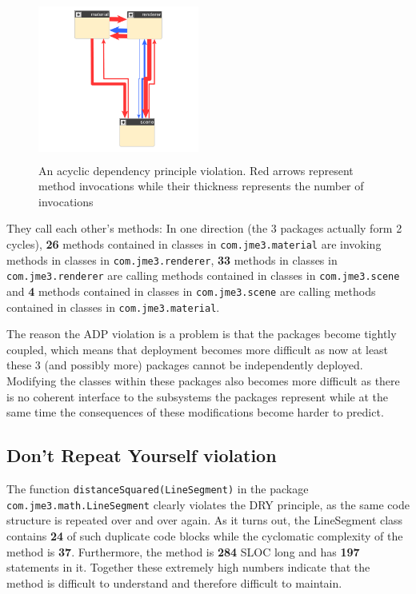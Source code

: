 \documentclass[a4paper, 10pt]{article}
\begin{document}
\begin{figure}
\includegraphics[width=200px, height=200px]{figures/adp-violation.png}
\caption{An acyclic dependency principle violation. Red arrows
  represent method invocations while their thickness represents the
  number of invocations}
\label{fig:adp-violation}
\end{figure}

They call each other's methods: In one direction (the 3 packages
actually form 2 cycles), \textbf{26} methods contained in classes in
\verb|com.jme3.material| are invoking methods in classes in
\verb|com.jme3.renderer|, \textbf{33} methods in classes in
\verb|com.jme3.renderer| are calling methods contained in classes in
\verb|com.jme3.scene| and \textbf{4} methods contained in classes in
\verb|com.jme3.scene| are calling methods contained in classes in
\verb|com.jme3.material|.

The reason the ADP violation is a problem is that the packages become
tightly coupled, which means that deployment becomes more difficult as
now at least these 3 (and possibly more) packages cannot be
independently deployed.
Modifying the classes within these packages also becomes more
difficult as there is no coherent interface to the subsystems the
packages represent while at the same time the consequences of these
modifications become harder to predict.\\

\subsection{Don't Repeat Yourself violation}
\label{sec:dry_violation}

The function \verb|distanceSquared(LineSegment)| in the package\\
\verb|com.jme3.math.LineSegment| clearly violates the DRY principle,
as the same code structure is repeated over and over again. As it turns
out, the LineSegment class contains \textbf{24} of such duplicate code
blocks while the cyclomatic complexity of the method is
\textbf{37}. Furthermore, the method is \textbf{284} SLOC long and has
\textbf{197} statements in it. Together these extremely high numbers
indicate that the method is difficult to understand and therefore
difficult to maintain.
\end{document}
